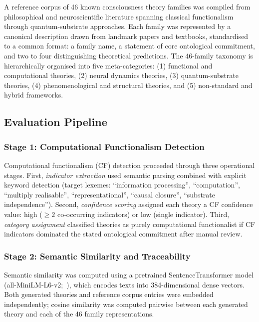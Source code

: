 \documentclass[pdflatex,sn-mathphys-num]{sn-jnl}
\begin{document}
A reference corpus of 46 known consciousness theory families was compiled from
philosophical and neuroscientific literature spanning classical functionalism
through quantum-substrate approaches.  Each family was represented by a
canonical description drawn from landmark papers and textbooks, standardised to
a common format: a family name, a statement of core ontological commitment, and
two to four distinguishing theoretical predictions.  The 46-family taxonomy
is hierarchically organised into five meta-categories: (1) functional and
computational theories, (2) neural dynamics theories, (3) quantum-substrate
theories, (4) phenomenological and structural theories, and (5) non-standard
and hybrid frameworks.

\subsection{Evaluation Pipeline}

\subsubsection{Stage 1: Computational Functionalism Detection}

Computational functionalism (CF) detection proceeded through three operational
stages.  First, \emph{indicator extraction} used semantic parsing combined with
explicit keyword detection (target lexemes: ``information processing'',
``computation'', ``multiply realisable'', ``representational'', ``causal
closure'', ``substrate independence'').  Second, \emph{confidence scoring}
assigned each theory a CF confidence value: high ($\geq 2$ co-occurring
indicators) or low (single indicator).  Third, \emph{category assignment}
classified theories as purely computational functionalist if CF indicators
dominated the stated ontological commitment after manual review.

\subsubsection{Stage 2: Semantic Similarity and Traceability}

Semantic similarity was computed using a pretrained SentenceTransformer model
(all-MiniLM-L6-v2;~\cite{reimers2019sentencebert}), which encodes texts into
384-dimensional dense vectors.  Both generated theories and reference corpus
entries were embedded independently; cosine similarity was computed pairwise
between each generated theory and each of the 46 family representations.
\end{document}
